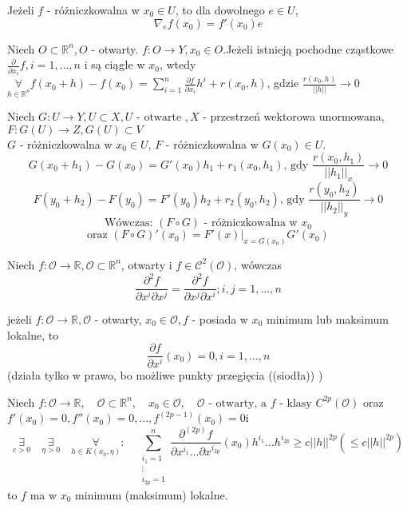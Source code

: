 \documentclass{article}
\begin{document}
\begin{tw}
    Jeżeli $f$ - różniczkowalna w $x_0 \in U$, to dla dowolnego $e\in U$, $$\nabla_e f(x_0) = f'(x_0)e$$\end{tw}
    \begin{tw}
    Niech $O\subset\mathbb{R}^{n}, O$ - otwarty. $f: O\to Y, x_0\in O$.Jeżeli istnieją pochodne cząstkowe $\frac{\partial}{\partial x_i} f, i=1,\dots,n$ i są ciągłe w $x_0$, wtedy $\underset{h\in\mathbb{R}^n}{\forall} f(x_0+h)-f(x_0)=\sum_{i=1}^{n} \frac{\partial f}{\partial x_i} h^i+r(x_0,h)$, gdzie $\frac{r(x_0,h)}{||h||}\to0$\end{tw}
\begin{tw}
Niech $G:U \to Y, U\subset X, U \text{ - otwarte }, X$ - przestrzeń wektorowa unormowana, $F: G(U) \to Z, G(U) \subset V$\\$G$ - różniczkowalna w $x_0\in U$, $F$ - różniczkowalna w $G(x_0)\in U$.\\$$G(x_0 + h_1) - G(x_0) = G'(x_0)h_1+r_1(x_0,h_1)\text{, gdy }\frac{r(x_0,h_1)}{||h_1||_x} \to 0$$$$F(y_0 + h_2) - F(y_0) = F'(y_0)h_2+r_2(y_0,h_2)\text{, gdy }\frac{r(y_0,h_2)}{||h_2||_y} \to 0$$$$\text{Wówczas: } (F \circ G ) \text{ - różniczkowalna w } x_0$$$$\text{oraz } (F \circ G)' (x_0) = \left . F'(x)\right |_{x=G(x_0)} G'(x_0)$$\end{tw}
\begin{tw}
Niech $f: \mathcal{O}\to\mathbb{R}, \mathcal{O}\subset \mathbb{R}^n$, otwarty i $f\in\mathcal{C}^2(\mathcal{O})$, wówczas$$\frac{\partial^2 f}{\partial x^i \partial x^j} = \frac{\partial^2 f}{\partial x^j \partial x^i}; i,j=1,\dots,n$$\end{tw}
\begin{stw}
    jeżeli $f: \mathcal{O} \rightarrow \mathbb{R}, \mathcal{O}$ - otwarty, $x_0 \in \mathcal{O}, f$ - posiada w $x_0$ minimum lub maksimum lokalne, to $$\frac{\partial f}{\partial x^i} (x_0) = 0, i = 1,\dots,n$$(działa tylko w prawo, bo możliwe punkty przegięcia ((siodła)) )\end{stw}\begin{tw}
Niech $f: \mathcal{O} \to \mathbb{R}, \quad\mathcal{O}\subset\mathbb{R}^n, \quad x_0\in\mathcal{O}, \quad \mathcal{O} \text{ - otwarty, a } f \text{ - klasy } C^{2p} (\mathcal{O})$ oraz $f'(x_0) = 0, f''(x_0) = 0,\dots,f^{(2p-1)} (x_0) = 0$i $$\underset{c > 0}{\exists} \quad\underset{\eta > 0}{\exists} \quad\underset{h\in K(x_0,\eta)}{\forall}: \quad \sum_{\substack{i_1 = 1\\ \vdots \\ i_{2p} = 1}}^n \frac{\partial^{(2p)} f}{\partial x^{i_1} \dots \partial x^{i_{2p}}} (x_0) h^{i_1} \dots h^{i_{2p}} \geq c ||h||^{2p} (\leq c||h||^{2p})$$to $f$ ma w $x_0$ minimum (maksimum) lokalne.\end{tw}
\end{document}
